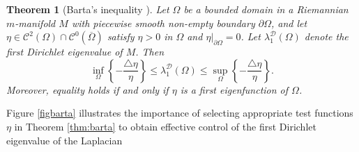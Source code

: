 \documentclass{article}
\newtheorem{theorem}{Theorem}[section]
\begin{document}
\begin{theorem}[Barta's inequality \cite{Barta1937}]\label{thm:barta}
Let \(\Omega\) be a bounded domain in a  Riemannian $m$-manifold $M$ with piecewise smooth non-empty boundary \(\partial \Omega\), and let \(\eta \in \mathcal{C}^{2}(\Omega)\cap \mathcal{C}^{0}(\overline{\Omega})\) satisfy \(\eta>0\) in \(\Omega\) and \(\eta|_{\partial \Omega}=0\). Let \(\lambda_{1}^{\mathcal{D}}(\Omega)\) denote the first Dirichlet eigenvalue of \(M\). Then
\begin{equation}\label{eq:barta}
\inf_{\Omega}\!\left\{-\frac{\triangle \eta}{\eta} \right\} \leq
\lambda_{1}^{\mathcal{D}}(\Omega) \leq  \sup_{\Omega}\!\left\{-\frac{\triangle \eta}{\eta} \right\}. 
\end{equation}
Moreover, equality holds if and only if \(\eta\) is a first eigenfunction of \(\Omega\).
\end{theorem}
Figure \eqref{figbarta} illustrates the importance of selecting appropriate test functions $\eta$ in Theorem \eqref{thm:barta} to obtain effective control of the first Dirichlet eigenvalue of the Laplacian
\end{document}
